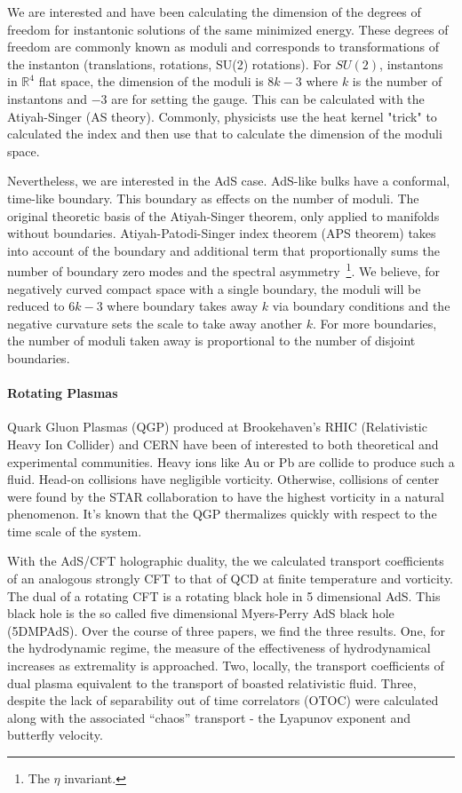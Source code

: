 \documentclass[12pt]{article}
\begin{document}
We are interested and have been calculating the dimension of the degrees of freedom for instantonic solutions of the same minimized energy.
These degrees of freedom are commonly known as moduli and corresponds to transformations of the instanton (translations, rotations, SU(2) rotations).
For $SU(2)$, instantons in $\mathds{R}^4$ flat space, the dimension of the moduli is $8k - 3$ where $k$ is the number of instantons and $-3$ are for setting the gauge.
This can be calculated with the Atiyah-Singer (AS theory).
Commonly, physicists use the heat kernel "trick" to calculated the index and then use that to calculate the dimension of the moduli space.

Nevertheless, we are interested in the AdS case. 
AdS-like bulks have a conformal, time-like boundary.
This boundary as effects on the number of moduli.
The original theoretic basis of the Atiyah-Singer theorem, only applied to manifolds without boundaries. 
Atiyah-Patodi-Singer index theorem (APS theorem) takes into account of the boundary and additional term that proportionally sums the number of boundary zero modes and the spectral asymmetry\
  \footnote{The $\eta$ invariant.}.
We believe, for negatively curved compact space with a single boundary, the moduli will be reduced to $6k - 3$ where boundary takes away $k$ via boundary conditions and the negative curvature sets the scale to take away another $k$.
For more boundaries, the number of moduli taken away is proportional to the number of disjoint boundaries.

\paragraph{Rotating Plasmas}

Quark Gluon Plasmas (QGP) produced at Brookehaven's RHIC (Relativistic Heavy Ion Collider) and CERN have been of interested to both theoretical and experimental communities.
Heavy ions like Au or Pb are collide to produce such a fluid.
Head-on collisions have negligible vorticity.
Otherwise, collisions of center were found by the STAR collaboration to have the highest vorticity in a natural phenomenon.
It's known that the QGP thermalizes quickly with respect to the time scale of the system.

With the AdS/CFT holographic duality, the we calculated transport coefficients of an analogous strongly CFT to that of QCD at finite temperature and vorticity.
The dual of a rotating CFT is a rotating black hole in 5 dimensional AdS. 
This black hole is the so called five dimensional Myers-Perry AdS black hole (5DMPAdS).
Over the course of three papers, we find the three results. 
One, for the hydrodynamic regime, the measure of the effectiveness of hydrodynamical increases as extremality is approached.
Two, locally, the transport coefficients of dual plasma equivalent to the transport of boasted relativistic fluid.
Three, despite the lack of separability out of time correlators (OTOC) were calculated along with the associated ``chaos'' transport - the Lyapunov exponent and butterfly velocity.
\end{document}
